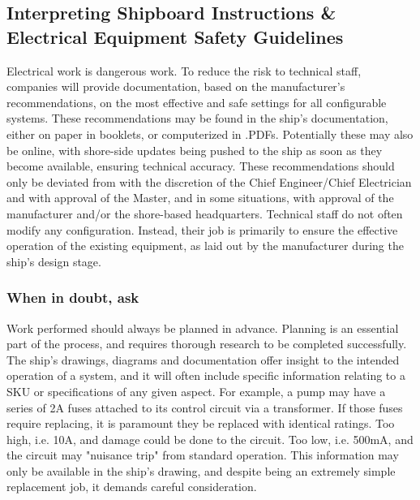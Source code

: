 \documentclass[11pt,a4paper]{article}
\begin{document}
\subsection{Interpreting Shipboard Instructions \& Electrical Equipment Safety Guidelines}
Electrical work is dangerous work. To reduce the risk to technical staff, companies will provide documentation, based on the manufacturer's recommendations, on the most effective and safe settings for all configurable systems. These recommendations may be found in the ship's documentation, either on paper in booklets, or computerized in .PDFs. Potentially these may also be online, with shore-side updates being pushed to the ship as soon as they become available, ensuring technical accuracy. These recommendations should only be deviated from with the discretion of the Chief Engineer/Chief Electrician and with approval of the Master, and in some situations, with approval of the manufacturer and/or the shore-based headquarters. Technical staff do not often modify any configuration. Instead, their job is primarily to ensure the effective operation of the existing equipment, as laid out by the manufacturer during the ship's design stage.
\subsubsection*{When in doubt, ask}
Work performed should always be planned in advance. Planning is an essential part of the process, and requires thorough research to be completed successfully. The ship's drawings, diagrams and documentation offer insight to the intended operation of a system, and it will often include specific information relating to a SKU or specifications of any given aspect. For example, a pump may have a series of 2A fuses attached to its control circuit via a transformer. If those fuses require replacing, it is paramount they be replaced with identical ratings. Too high, i.e. 10A, and damage could be done to the circuit. Too low, i.e. 500mA, and the circuit may "nuisance trip" from standard operation. This information may only be available in the ship's drawing, and despite being an extremely simple replacement job, it demands careful consideration.
\newpage
\end{document}
